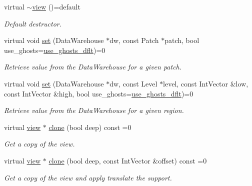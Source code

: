 \begin{DoxyCompactItemize}
\item 
virtual \hyperlink{classUintah_1_1PhaseField_1_1detail_1_1view_3_01ScalarField_3_01T_01_4_01_4_a816f15a63f4e29dd82c7f6fdee60a81d}{$\sim$view} ()=default
\begin{DoxyCompactList}\small\item\em Default destructor. \end{DoxyCompactList}\item 
virtual void \hyperlink{classUintah_1_1PhaseField_1_1detail_1_1view_3_01ScalarField_3_01T_01_4_01_4_ae90ea8b33fde8515a1f2e8f5c03c0166}{set} (Data\+Warehouse $\ast$dw, const Patch $\ast$patch, bool use\+\_\+ghosts=\hyperlink{classUintah_1_1PhaseField_1_1detail_1_1view_3_01ScalarField_3_01T_01_4_01_4_aab1ca433909d91301560b00feb645d8b}{use\+\_\+ghosts\+\_\+dflt})=0
\begin{DoxyCompactList}\small\item\em Retrieve value from the Data\+Warehouse for a given patch. \end{DoxyCompactList}\item 
virtual void \hyperlink{classUintah_1_1PhaseField_1_1detail_1_1view_3_01ScalarField_3_01T_01_4_01_4_a5fc830b30b120922cfe8a2c008d96109}{set} (Data\+Warehouse $\ast$dw, const Level $\ast$level, const Int\+Vector \&low, const Int\+Vector \&high, bool use\+\_\+ghosts=\hyperlink{classUintah_1_1PhaseField_1_1detail_1_1view_3_01ScalarField_3_01T_01_4_01_4_aab1ca433909d91301560b00feb645d8b}{use\+\_\+ghosts\+\_\+dflt})=0
\begin{DoxyCompactList}\small\item\em Retrieve value from the Data\+Warehouse for a given region. \end{DoxyCompactList}\item 
virtual \hyperlink{classUintah_1_1PhaseField_1_1detail_1_1view}{view} $\ast$ \hyperlink{classUintah_1_1PhaseField_1_1detail_1_1view_3_01ScalarField_3_01T_01_4_01_4_a6e11243c9d776a7b703e524ea4151a16}{clone} (bool deep) const =0
\begin{DoxyCompactList}\small\item\em Get a copy of the view. \end{DoxyCompactList}\item 
virtual \hyperlink{classUintah_1_1PhaseField_1_1detail_1_1view}{view} $\ast$ \hyperlink{classUintah_1_1PhaseField_1_1detail_1_1view_3_01ScalarField_3_01T_01_4_01_4_abd928104240e329f3bc4441ebab7c50c}{clone} (bool deep, const Int\+Vector \&offset) const =0
\begin{DoxyCompactList}\small\item\em Get a copy of the view and apply translate the support. \end{DoxyCompactList}\item 

\end{DoxyCompactItemize}
